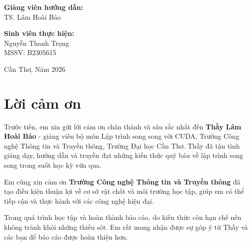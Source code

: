 \documentclass[12pt,a4paper]{report}
\begin{document}
\begin{titlepage}
\begin{center}
        \begin{minipage}{0.45\textwidth}
            \begin{flushleft}
                \textbf{Giảng viên hướng dẫn:}\\
                TS. Lâm Hoài Bảo
            \end{flushleft}
        \end{minipage}
        \hfill
        \begin{minipage}{0.45\textwidth}
            \begin{flushright}
                \textbf{Sinh viên thực hiện:}\\
                Nguyễn Thanh Trọng\\
                MSSV: B2305615
            \end{flushright}
        \end{minipage}
        
        \vfill
        
        {\large Cần Thơ, Năm 2026}
        
    \end{center}
\end{titlepage}

\newpage
\thispagestyle{empty}
\mbox{}
\newpage

\chapter*{Lời cảm ơn}

Trước tiên, em xin gửi lời cảm ơn chân thành và sâu sắc nhất đến \textbf{Thầy Lâm Hoài Bảo} - giảng viên bộ môn Lập trình song song với CUDA, Trường Công nghệ Thông tin và Truyền thông, Trường Đại học Cần Thơ. Thầy đã tận tình giảng dạy, hướng dẫn và truyền đạt những kiến thức quý báu về lập trình song song trong suốt học kỳ vừa qua.

Em cũng xin cảm ơn \textbf{Trường Công nghệ Thông tin và Truyền thông} đã tạo điều kiện thuận lợi về cơ sở vật chất và môi trường học tập, giúp em có thể tiếp cận và thực hành với các công nghệ hiện đại.

Trong quá trình học tập và hoàn thành báo cáo, do kiến thức còn hạn chế nên không tránh khỏi những thiếu sót. Em rất mong nhận được sự góp ý từ Thầy và các bạn để báo cáo được hoàn thiện hơn.
\end{document}
